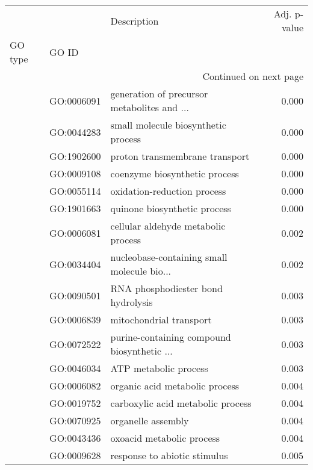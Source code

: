 \begin{longtable}{lllr}
\toprule
   &            &                                  Description &  Adj. p-value \\
GO type & GO ID &                                              &               \\
\midrule
\endhead
\midrule
\multicolumn{4}{r}{{Continued on next page}} \\
\midrule
\endfoot

\bottomrule
\endlastfoot
\multirow{63}{*}{BP} & GO:0006091 &  generation of precursor metabolites and ... &         0.000 \\
   & GO:0044283 &          small molecule biosynthetic process &         0.000 \\
   & GO:1902600 &               proton transmembrane transport &         0.000 \\
   & GO:0009108 &                coenzyme biosynthetic process &         0.000 \\
   & GO:0055114 &                  oxidation-reduction process &         0.000 \\
   & GO:1901663 &                 quinone biosynthetic process &         0.000 \\
   & GO:0006081 &          cellular aldehyde metabolic process &         0.002 \\
   & GO:0034404 &  nucleobase-containing small molecule bio... &         0.002 \\
   & GO:0090501 &           RNA phosphodiester bond hydrolysis &         0.003 \\
   & GO:0006839 &                      mitochondrial transport &         0.003 \\
   & GO:0072522 &  purine-containing compound biosynthetic ... &         0.003 \\
   & GO:0046034 &                        ATP metabolic process &         0.003 \\
   & GO:0006082 &               organic acid metabolic process &         0.004 \\
   & GO:0019752 &            carboxylic acid metabolic process &         0.004 \\
   & GO:0070925 &                           organelle assembly &         0.004 \\
   & GO:0043436 &                    oxoacid metabolic process &         0.004 \\
   & GO:0009628 &                 response to abiotic stimulus &         0.005 \\

\end{longtable}
